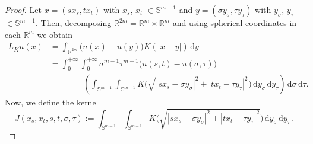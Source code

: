 \documentclass[12pt,reqno]{amsart}
\theoremstyle{definition}
\theoremstyle{remark}
\newcommand{\con}[1]{\mathbb{#1}}
\newcommand{\R}{\con{R}} %
\newcommand{\Sph}{\con{S}} %
\renewcommand{\d}{\,\mathrm{d}} %
\newcommand{\bpar}[1]{\left ( {#1}\right )}
\numberwithin{equation}{section}
\begin{document}
\begin{proof}
	Let $x = (s x_s, t x_t)$ with $x_s$, $x_t$ $\in \Sph^{m-1}$ and $y = (\sigma y_\sigma, \tau
	y_\tau)$ with $y_\sigma$, $y_\tau$ $\in \Sph^{m-1}$. Then, decomposing $\R^{2m} = \R^m \times \R^m$
	and using spherical coordinates in each $\R^m$ we obtain
	\begin{align*}
	L_Ku(x) &= \int_{\R^{2m}} \big( u(x) - u(y)\big) K( |x-y|) \d y &\\
	&= \int_0^{+\infty}  \int_0^{+\infty} \sigma^{m-1} \tau^{m-1} \big(u(s,t) - u(\sigma, \tau)\big)  \\
	&\quad \quad \quad \quad  \bpar{\int_{\Sph^{m-1}}  \int_{\Sph^{m-1}} K \Big( \sqrt{|sx_s - \sigma y_\sigma|^2 + |t x_t - \tau y_\tau|^2 } \Big) \d y_\sigma \d y_\tau } \d \sigma \d \tau .
	\end{align*}
	Now, we define the kernel
	\begin{equation}
	\label{Eq:KernelSTVariablesProof1}
	J(x_s, x_t, s,t,\sigma, \tau) := \int_{\Sph^{m-1}}  \int_{\Sph^{m-1}} K \Big( \sqrt{|sx_s - \sigma y_\sigma|^2 + |t x_t - \tau y_\tau|^2 }\Big ) \d y_\sigma \d y_\tau \,.
	\end{equation}
	

\end{proof}
\end{document}
